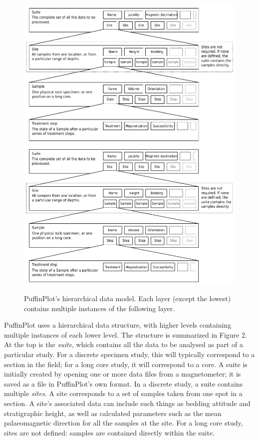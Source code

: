 \documentclass[a4paper,british]{article}
\begin{document}
\begin{figure}[htbp]
\centering
\ifpdf\includegraphics{figures/data-model.pdf}
\else\includegraphics{figures/data-model.png}
\fi
\caption{PuffinPlot's hierarchical data model. Each layer (except the
lowest) contains multiple instances of the following layer.}
\end{figure}

PuffinPlot uses a hierarchical data structure, with higher levels
containing multiple instances of each lower level. The structure is
summarized in Figure 2. At the top is the \emph{suite}, which contains
all the data to be analysed as part of a particular study. For a
discrete specimen study, this will typically correspond to a section in
the field; for a long core study, it will correspond to a core. A suite
is initially created by opening one or more data files from a
magnetometer; it is saved as a file in PuffinPlot's own format. In a
discrete study, a suite contains multiple \emph{sites}. A site
corresponds to a set of samples taken from one spot in a section. A
site's associated data can include such things as bedding attitude and
stratigraphic height, as well as calculated parameters such as the mean
palaeomagnetic direction for all the samples at the site. For a long
core study, sites are not defined: samples are contained directly within
the suite.
\end{document}
